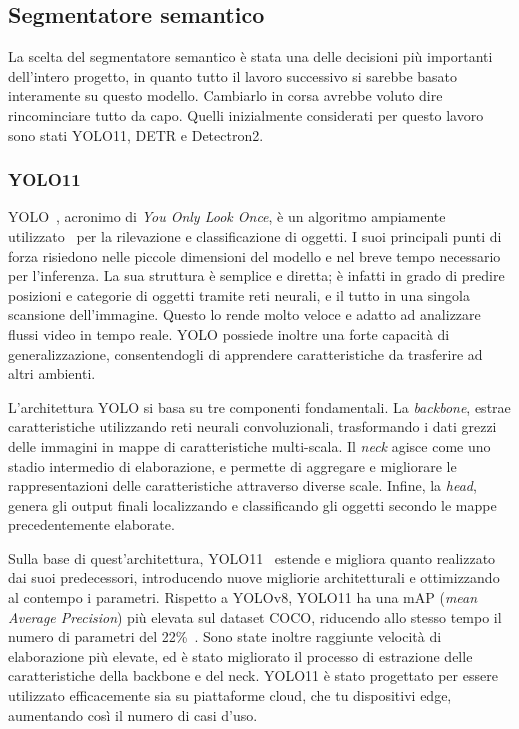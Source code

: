 \documentclass[12pt]{report}
\begin{document}
\subsection{Segmentatore semantico}
\label{sec:segmentatore_semantico}

La scelta del segmentatore semantico è stata una delle decisioni più importanti dell'intero progetto, in quanto tutto il lavoro successivo si sarebbe basato interamente su questo modello. Cambiarlo in corsa avrebbe voluto dire rincominciare tutto da capo. Quelli inizialmente considerati per questo lavoro sono stati YOLO11, DETR e Detectron2.

\subsubsection{YOLO11}
\label{sec:yolo11}

YOLO~\cite{JIANG20221066}, acronimo di \textit{You Only Look Once}, è un algoritmo ampiamente utilizzato~\cite{sultana2020review} per la rilevazione e classificazione di oggetti. I suoi principali punti di forza risiedono nelle piccole dimensioni del modello e nel breve tempo necessario per l'inferenza. La sua struttura è semplice e diretta; è infatti in grado di predire posizioni e categorie di oggetti tramite reti neurali, e il tutto in una singola scansione dell'immagine. Questo lo rende molto veloce e adatto ad analizzare flussi video in tempo reale. YOLO possiede inoltre una forte capacità di generalizzazione, consentendogli di apprendere caratteristiche da trasferire ad altri ambienti.

L'architettura YOLO si basa su tre componenti fondamentali. La \textit{backbone}, estrae caratteristiche utilizzando reti neurali convoluzionali, trasformando i dati grezzi delle immagini in mappe di caratteristiche multi-scala. Il \textit{neck} agisce come uno stadio intermedio di elaborazione, e permette di aggregare e migliorare le rappresentazioni delle caratteristiche attraverso diverse scale. Infine, la \textit{head}, genera gli output finali localizzando e classificando gli oggetti secondo le mappe precedentemente elaborate.

Sulla base di quest'architettura, YOLO11~\cite{yolo11_ultralytics} estende e migliora quanto realizzato dai suoi predecessori, introducendo nuove migliorie architetturali e ottimizzando al contempo i parametri. Rispetto a YOLOv8, YOLO11 ha una mAP (\textit{mean Average Precision}) più elevata sul dataset COCO, riducendo allo stesso tempo il numero di parametri del 22\%~\cite{khanam2024yolov11overviewkeyarchitectural}. Sono state inoltre raggiunte velocità di elaborazione più elevate, ed è stato migliorato il processo di estrazione delle caratteristiche della backbone e del neck. YOLO11 è stato progettato per essere utilizzato efficacemente sia su piattaforme cloud, che tu dispositivi edge, aumentando così il numero di casi d'uso.
\end{document}

